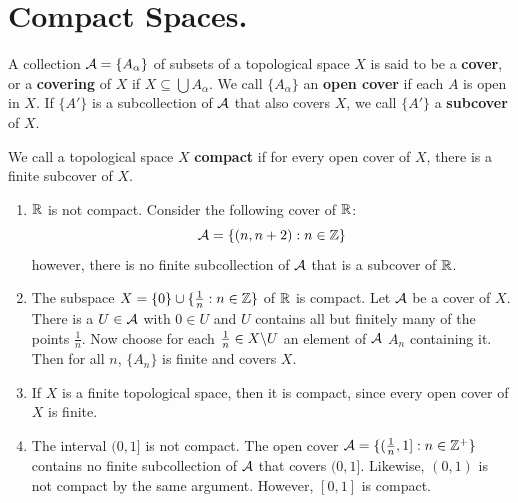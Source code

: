 
\section{Compact Spaces.}

\begin{definition}
    A collection $\mathcal{A}=\{A_{\alpha}\}$ of subsets of a topological space $X$ is said to be a  \textbf{cover}, or a
    \textbf{covering} of $X$ if  $X \subseteq \bigcup{A_\alpha}$. We call $\{A_\alpha\}$ an \textbf{open cover} if each $A$
    is open in  $X$. If  $\{A'\}$ is a subcollection of $\mathcal{A}$ that also covers $X$, we call
    $\{A'\}$ a \textbf{subcover} of $X$.
\end{definition}

\begin{definition}
    We call a topological space $X$ \textbf{compact} if for every open cover of $X$, there is a
    finite subcover of $X$.
\end{definition}

\begin{example}
    \begin{enumerate}[label=(\arabic*)]
        \item     $\mathbb{R}$ is not compact. Consider the following cover of  $\mathbb{R}$:
            \begin{equation*}
                \mathcal{A}=\{(n,n+2):n \in \mathbb{Z}\}
            \end{equation*}
            however, there is no finite subcollection of $\mathcal{A}$ that is a subcover of  $\mathbb{R}$.

        \item The subspace $X=\{0\} \cup \{\frac{1}{n}: n \in \mathbb{Z}\}$ of $\mathbb{R}$ is compact. Let  $\mathcal{A}$
            be a cover of  $X$. There is a  $U \in \mathcal{A}$ with  $0 \in U$ and $U$ contains all but
            finitely many of the points  $ \frac{1}{n}$. Now choose for each $\frac{1}{n} \in
            X \backslash U$ an element of $\mathcal{A}$ $A_{n}$ containing it. Then for all $n$,  $\{A_n\}$ is
            finite and covers $X$.

        \item If  $X$ is a finite topological space, then it is compact, since every open cover of
            $X$ is finite.

        \item The interval  $(0,1]$ is not compact. The open cover $\mathcal{A}=\{(\frac{1}{n}, 1]: n \in
            \mathbb{Z}^+\}$ contains no finite subcollection of $\mathcal{A}$ that covers  $(0,1]$. Likewise,
            $(0,1)$ is not compact by the same argument. However, $[0,1]$ is compact.
    \end{enumerate}
\end{example} 


